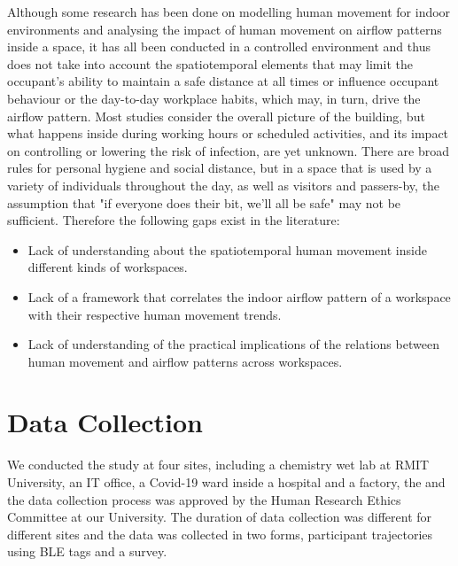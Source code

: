 \documentclass[acmtog]{acmart}
\begin{document}
Although some research has been done on modelling human movement for indoor environments and analysing the impact of human movement on airflow patterns inside a space, it has all been conducted in a controlled environment and thus does not take into account the spatiotemporal elements that may limit the occupant's ability to maintain a safe distance at all times or influence occupant behaviour or the day-to-day workplace habits, which may, in turn, drive the airflow pattern. Most studies consider the overall picture of the building, but what happens inside during working hours or scheduled activities, and its impact on controlling or lowering the risk of infection, are yet unknown. There are broad rules for personal hygiene and social distance, but in a space that is used by a variety of individuals throughout the day, as well as visitors and passers-by, the assumption that "if everyone does their bit, we'll all be safe" may not be sufficient.
Therefore the following gaps exist in the literature:
\begin{itemize}
    \item Lack of understanding about the spatiotemporal human movement inside different kinds of workspaces.
    \item Lack of a framework that correlates the indoor airflow pattern of a workspace with their respective human movement trends.
    \item Lack of understanding of the practical implications of the relations between human movement and airflow patterns across workspaces.
\end{itemize}




\section{Data Collection}
We conducted the study at four sites, including a chemistry wet lab at RMIT University, an IT office, a Covid-19 ward inside a hospital and a factory, the and the data collection process was approved by the Human Research Ethics Committee at our University. The duration of data collection was different for different sites and the data was collected in two forms, participant trajectories using BLE tags and a survey.
\end{document}
